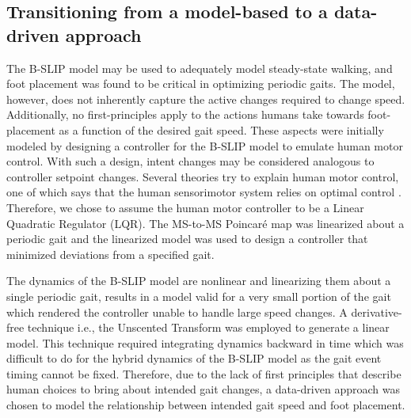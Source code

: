 \subsection{Transitioning from a model-based to a data-driven approach}
The B-SLIP model may be used to adequately model steady-state walking, and foot placement was found to be critical in optimizing periodic gaits. The model, however, does not inherently capture the active changes required to change speed. Additionally, no first-principles apply to the actions humans take towards foot-placement as a function of the desired gait speed. These aspects were initially modeled by designing a controller for the B-SLIP model to emulate human motor control. With such a design, intent changes may be considered analogous to controller setpoint changes. Several theories try to explain human motor control, one of which says that the human sensorimotor system relies on optimal control \cite{todorov2004optimality,sylla2014assessing}. Therefore, we chose to assume the human motor controller to be a Linear Quadratic Regulator (LQR). The MS-to-MS Poincar\'e map was linearized about a periodic gait and the linearized model was used to design a controller that minimized deviations from a specified gait. 

The dynamics of the B-SLIP model are nonlinear and linearizing them about a single periodic gait, results in a model valid for a very small portion of the gait which rendered the controller unable to handle large speed changes. A derivative-free technique i.e., the Unscented Transform \cite{manchester2016derivative} was employed to generate a linear model. This technique required integrating dynamics backward in time which was difficult to do for the hybrid dynamics of the B-SLIP model as the gait event timing cannot be fixed. Therefore, due to the lack of first principles that describe human choices to bring about intended gait changes, a data-driven approach was chosen to model the relationship between intended gait speed and foot placement.

